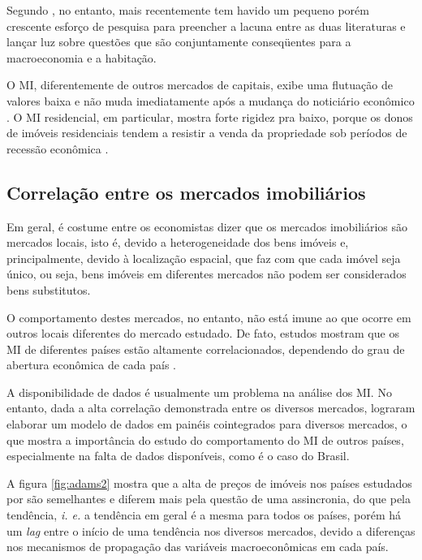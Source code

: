 \documentclass[
	12pt,				%
	oneside,			%
	a4paper,			%
	chapter=TITLE,		%
	section=TITLE,		%
	english,			%
	brazil				%
	]{abntex2}
\begin{document}
\begin{refsection}
Segundo \textcite[p.~4]{LEUNG}, no entanto, mais recentemente tem havido um pequeno porém
crescente esforço de pesquisa para preencher a lacuna entre as duas literaturas
e lançar luz sobre questões que são conjuntamente conseqüentes para a
macroeconomia e a habitação.

O \gls{MI}, diferentemente de outros mercados de capitais, exibe uma flutuação
de valores baixa e não muda imediatamente após a mudança do noticiário econômico
\autocite[3]{ADAMS2010}. O \gls{MI} residencial, em particular, mostra forte rigidez
pra baixo, porque os donos de imóveis residenciais tendem a resistir a venda da
propriedade sob períodos de recessão econômica \autocite[129]{Case2000}.

\hypertarget{correlauxe7uxe3o-entre-os-mercados-imobiliuxe1rios}{%
\subsection{Correlação entre os mercados imobiliários}\label{correlauxe7uxe3o-entre-os-mercados-imobiliuxe1rios}}

Em geral, é costume entre os economistas dizer que os mercados imobiliários são
mercados locais, isto é, devido a heterogeneidade dos bens imóveis e,
principalmente, devido à localização espacial, que faz com que cada imóvel seja
único, ou seja, bens imóveis em diferentes mercados não podem ser
considerados bens substitutos.

O comportamento destes mercados, no entanto, não está imune ao que ocorre em
outros locais diferentes do mercado estudado. De fato, estudos mostram que os
\gls{MI} de diferentes países estão altamente correlacionados, dependendo do
grau de abertura econômica de cada país \autocites{Case2000}{ADAMS2010}.

A disponibilidade de dados é usualmente um problema na análise dos \gls{MI}. No
entanto, dada a alta correlação demonstrada entre os diversos mercados,
\textcite{ADAMS2010} lograram elaborar um modelo de dados em painéis cointegrados
para diversos mercados, o que mostra a importância do estudo do comportamento do
\gls{MI} de outros países, especialmente na falta de dados disponíveis, como é
o caso do Brasil.

A figura \ref{fig:adams2} mostra que a alta de preços de imóveis nos países
estudados por \textcite{ADAMS2010} são semelhantes e diferem mais pela questão de uma
assincronia, do que pela tendência, \emph{i. e.} a tendência em geral é a mesma para
todos os países, porém há um \emph{lag} entre o início de uma tendência nos diversos
mercados, devido a diferenças nos mecanismos de propagação das variáveis
macroeconômicas em cada país.
\begin{figure}[H]


\end{figure}
\end{refsection}
\end{document}
